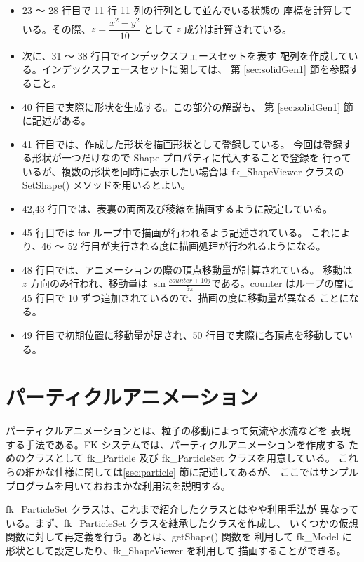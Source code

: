 \begin{itemize}
 \item 23 〜 28 行目で 11 行 11 列の行列として並んでいる状態の
	座標を計算している。その際、\(z = \dfrac{x^2 - y^2}{10}\)
	として \(z\) 成分は計算されている。

 \item 次に、31 〜 38 行目でインデックスフェースセットを表す
	配列を作成している。インデックスフェースセットに関しては、
	第 \ref{sec:solidGen1} 節を参照すること。

 \item 40 行目で実際に形状を生成する。この部分の解説も、
	第 \ref{sec:solidGen1} 節に記述がある。

 \item 41 行目では、作成した形状を描画形状として登録している。
	今回は登録する形状が一つだけなので Shape プロパティに代入することで登録を
	行っているが、複数の形状を同時に表示したい場合は fk\_ShapeViewer クラスの
	SetShape() メソッドを用いるとよい。

 \item 42,43 行目では、表裏の両面及び稜線を描画するように設定している。

 \item 45 行目では for ループ中で描画が行われるよう記述されている。
	これにより、46 〜 52 行目が実行される度に描画処理が行われるようになる。

 \item 48 行目では、アニメーションの際の頂点移動量が計算されている。
	移動は \(z\) 方向のみ行われ、移動量は
	\(\sin\frac{counter + 10j}{5\pi}\)である。counter はループの度に
	45 行目で 10 ずつ追加されているので、描画の度に移動量が異なる
	ことになる。

 \item 49 行目で初期位置に移動量が足され、50 行目で実際に各頂点を移動している。
\end{itemize}

\section{パーティクルアニメーション}
パーティクルアニメーションとは、粒子の移動によって気流や水流などを
表現する手法である。FK システムでは、パーティクルアニメーションを作成する
ためのクラスとして fk\_Particle 及び fk\_ParticleSet クラスを用意している。
これらの細かな仕様に関しては\ref{sec:particle} 節に記述してあるが、
ここではサンプルプログラムを用いておおまかな利用法を説明する。

fk\_ParticleSet クラスは、これまで紹介したクラスとはやや利用手法が
異なっている。まず、fk\_ParticleSet クラスを継承したクラスを作成し、
いくつかの仮想関数に対して再定義を行う。あとは、getShape() 関数を
利用して fk\_Model に形状として設定したり、fk\_ShapeViewer を利用して
描画することができる。

